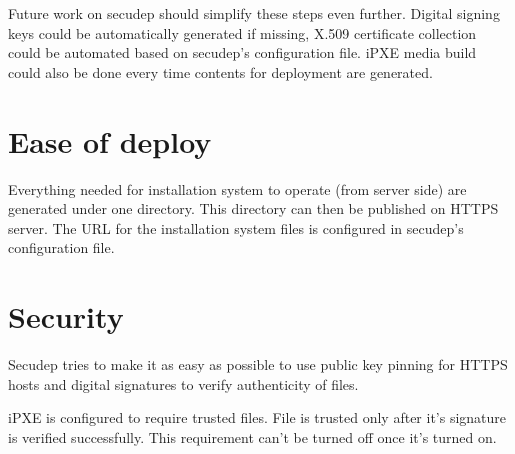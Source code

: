 Future work on secudep should simplify these steps even
further. Digital signing keys could be automatically generated if
missing, X.509 certificate collection could be automated based on
secudep's configuration file. iPXE media build could also be done every time
contents for deployment are generated.

\section{Ease of deploy}

Everything needed for installation system to operate (from server
side) are generated under one directory. This directory can then be
published on HTTPS server. The URL for the installation system files
is configured in secudep's configuration file.

\section{Security}

Secudep tries to make it as easy as possible to use public key pinning
for HTTPS hosts and digital signatures to verify authenticity of files.

iPXE is configured to require trusted files. File is trusted only
after it's signature is verified successfully. This requirement can't
be turned off once it's turned on.
